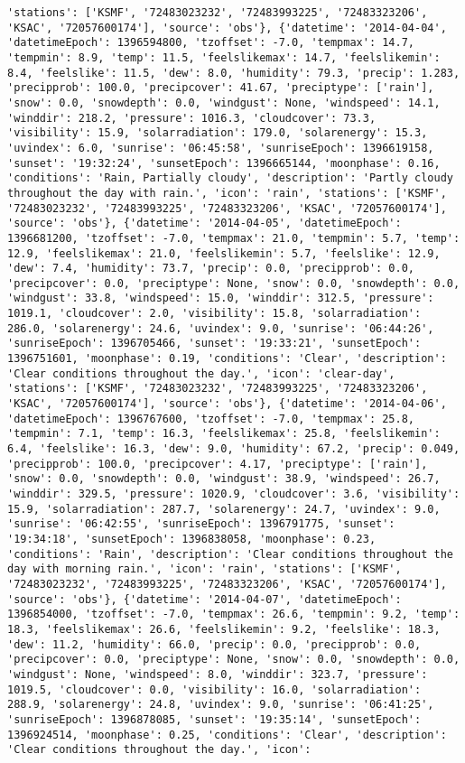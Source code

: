 \documentclass[
  letterpaper,
  DIV=11,
  numbers=noendperiod]{scrartcl}
\begin{document}
\begin{verbatim}
'stations': ['KSMF', '72483023232', '72483993225', '72483323206', 'KSAC', '72057600174'], 'source': 'obs'}, {'datetime': '2014-04-04', 'datetimeEpoch': 1396594800, 'tzoffset': -7.0, 'tempmax': 14.7, 'tempmin': 8.9, 'temp': 11.5, 'feelslikemax': 14.7, 'feelslikemin': 8.4, 'feelslike': 11.5, 'dew': 8.0, 'humidity': 79.3, 'precip': 1.283, 'precipprob': 100.0, 'precipcover': 41.67, 'preciptype': ['rain'], 'snow': 0.0, 'snowdepth': 0.0, 'windgust': None, 'windspeed': 14.1, 'winddir': 218.2, 'pressure': 1016.3, 'cloudcover': 73.3, 'visibility': 15.9, 'solarradiation': 179.0, 'solarenergy': 15.3, 'uvindex': 6.0, 'sunrise': '06:45:58', 'sunriseEpoch': 1396619158, 'sunset': '19:32:24', 'sunsetEpoch': 1396665144, 'moonphase': 0.16, 'conditions': 'Rain, Partially cloudy', 'description': 'Partly cloudy throughout the day with rain.', 'icon': 'rain', 'stations': ['KSMF', '72483023232', '72483993225', '72483323206', 'KSAC', '72057600174'], 'source': 'obs'}, {'datetime': '2014-04-05', 'datetimeEpoch': 1396681200, 'tzoffset': -7.0, 'tempmax': 21.0, 'tempmin': 5.7, 'temp': 12.9, 'feelslikemax': 21.0, 'feelslikemin': 5.7, 'feelslike': 12.9, 'dew': 7.4, 'humidity': 73.7, 'precip': 0.0, 'precipprob': 0.0, 'precipcover': 0.0, 'preciptype': None, 'snow': 0.0, 'snowdepth': 0.0, 'windgust': 33.8, 'windspeed': 15.0, 'winddir': 312.5, 'pressure': 1019.1, 'cloudcover': 2.0, 'visibility': 15.8, 'solarradiation': 286.0, 'solarenergy': 24.6, 'uvindex': 9.0, 'sunrise': '06:44:26', 'sunriseEpoch': 1396705466, 'sunset': '19:33:21', 'sunsetEpoch': 1396751601, 'moonphase': 0.19, 'conditions': 'Clear', 'description': 'Clear conditions throughout the day.', 'icon': 'clear-day', 'stations': ['KSMF', '72483023232', '72483993225', '72483323206', 'KSAC', '72057600174'], 'source': 'obs'}, {'datetime': '2014-04-06', 'datetimeEpoch': 1396767600, 'tzoffset': -7.0, 'tempmax': 25.8, 'tempmin': 7.1, 'temp': 16.3, 'feelslikemax': 25.8, 'feelslikemin': 6.4, 'feelslike': 16.3, 'dew': 9.0, 'humidity': 67.2, 'precip': 0.049, 'precipprob': 100.0, 'precipcover': 4.17, 'preciptype': ['rain'], 'snow': 0.0, 'snowdepth': 0.0, 'windgust': 38.9, 'windspeed': 26.7, 'winddir': 329.5, 'pressure': 1020.9, 'cloudcover': 3.6, 'visibility': 15.9, 'solarradiation': 287.7, 'solarenergy': 24.7, 'uvindex': 9.0, 'sunrise': '06:42:55', 'sunriseEpoch': 1396791775, 'sunset': '19:34:18', 'sunsetEpoch': 1396838058, 'moonphase': 0.23, 'conditions': 'Rain', 'description': 'Clear conditions throughout the day with morning rain.', 'icon': 'rain', 'stations': ['KSMF', '72483023232', '72483993225', '72483323206', 'KSAC', '72057600174'], 'source': 'obs'}, {'datetime': '2014-04-07', 'datetimeEpoch': 1396854000, 'tzoffset': -7.0, 'tempmax': 26.6, 'tempmin': 9.2, 'temp': 18.3, 'feelslikemax': 26.6, 'feelslikemin': 9.2, 'feelslike': 18.3, 'dew': 11.2, 'humidity': 66.0, 'precip': 0.0, 'precipprob': 0.0, 'precipcover': 0.0, 'preciptype': None, 'snow': 0.0, 'snowdepth': 0.0, 'windgust': None, 'windspeed': 8.0, 'winddir': 323.7, 'pressure': 1019.5, 'cloudcover': 0.0, 'visibility': 16.0, 'solarradiation': 288.9, 'solarenergy': 24.8, 'uvindex': 9.0, 'sunrise': '06:41:25', 'sunriseEpoch': 1396878085, 'sunset': '19:35:14', 'sunsetEpoch': 1396924514, 'moonphase': 0.25, 'conditions': 'Clear', 'description': 'Clear conditions throughout the day.', 'icon': 
\end{verbatim}
\end{document}
